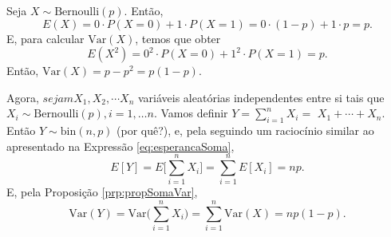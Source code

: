 \documentclass[]{book}
\theoremstyle{definition}
\theoremstyle{definition}
\theoremstyle{definition}
\theoremstyle{remark}
\begin{document}
Seja \(X\sim\mathrm{Bernoulli}(p)\).
Então, \[E(X) = 0\cdot P(X=0)+1\cdot P(X=1)=0\cdot (1-p) + 1\cdot p = p.\]
E, para calcular \(\mathrm{Var}(X)\), temos que obter
\[E(X^2)=0^2\cdot P(X=0)+1^2\cdot P(X=1)= p.\]
Então, \(\mathrm{Var}(X)=p - p^2=p(1-p).\)

Agora, \(sejam X_1, X_2, \cdots X_n\) variáveis aleatórias independentes entre si tais que \(X_i \sim\mathrm{Bernoulli}(p), i=1,\ldots n.\)
Vamos definir \(Y = \sum_{i=1}^{n}X_i =\) \(X_1 + \cdots + X_n.\)
Então \(Y\sim\mathrm{bin}(n,p)\) (por quê?), e, pela seguindo um raciocínio similar ao apresentado na Expressão \eqref{eq:esperancaSoma},
\[E[Y] = E\bigg[ \sum_{i=1}^{n}X_i \bigg] = \sum_{i=1}^{n}E[X_i]=n p.\]
E, pela Proposição \ref{prp:propSomaVar},
\[\mathrm{Var}(Y) = \mathrm{Var}\bigg(\sum_{i=1}^{n}X_i \bigg)=\sum_{i=1}^{n}\mathrm{Var}(X)=np(1-p).\]


\end{document}
